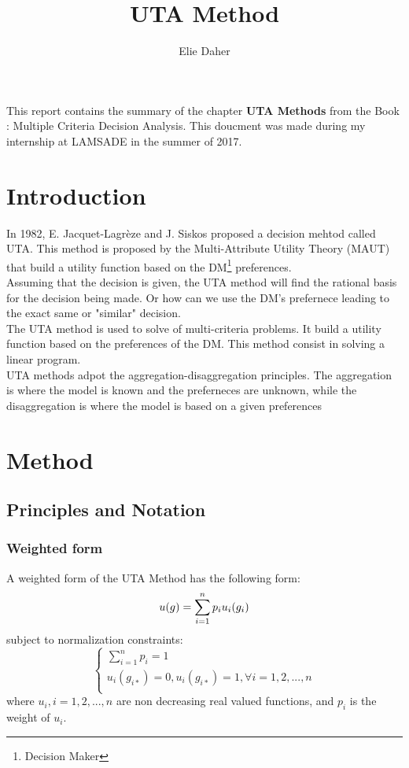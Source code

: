 \documentclass{report}
\title{UTA Method}
\author{Elie Daher}
\begin{document}
\maketitle
\abstract
This report contains the summary of the chapter \textbf{UTA Methods} from the Book : Multiple Criteria Decision Analysis. This doucment was made during my internship at LAMSADE in the summer of 2017.
\tableofcontents{}

\chapter{Introduction}

In 1982,  E. Jacquet-Lagrèze and J. Siskos proposed a decision mehtod called UTA. This method is proposed by the Multi-Attribute Utility Theory (MAUT) that build a utility function based on the DM\footnote{Decision Maker} preferences.\\ 
Assuming that the decision is given, the UTA method will find the rational basis for the decision being made. Or how can we use the DM's prefernece leading to the exact same or "similar" decision. \\  

The UTA method is used to solve of multi-criteria problems. It build a utility function based on the preferences of the DM. This method consist in solving a linear program.\\

UTA methods adpot the aggregation-disaggregation principles. The aggregation is where the model is known and the preferneces are unknown, while the disaggregation is where the model is based on a given preferences

\chapter{Method}
\section{Principles and Notation}
\subsection{Weighted form}
A weighted form of the UTA Method has the following form: 
\begin{equation}
u(g) = \sum_{i=1}^{n} p_i u_i (g_i)\\
\end{equation}
subject to normalization constraints:\\
\begin{equation}
  \left\{
      \begin{aligned}
      \sum_{i=1}^{n} p_i = 1 \\
      u_i(g_{i*}) = 0, u_i(g_{i*}) = 1,  \forall i = 1, 2, ..., n\\
      \end{aligned}
    \right.
\end{equation}
where $ u_i, i = 1,2,...,n$ are non decreasing real valued functions, and $p_i$ is the weight of $u_i$.\\
\end{document}
